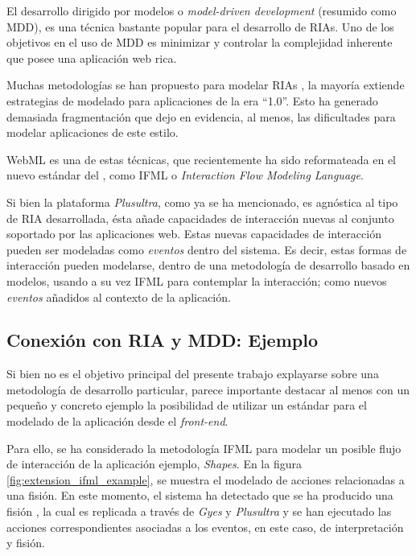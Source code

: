 El desarrollo dirigido por modelos o \emph{model-driven development} (resumido como MDD), es una técnica bastante popular para el desarrollo de RIAs. Uno de los objetivos en el uso de MDD es minimizar y controlar la complejidad inherente que posee una aplicación web rica. 

Muchas metodologías se han propuesto para modelar RIAs \citep{wright2008requirements} \citep{preciado2005necessity}, la mayoría extiende estrategias de modelado para aplicaciones de la era ``1.0''. Esto ha generado demasiada fragmentación que dejo en evidencia, al menos, las dificultades para modelar aplicaciones de este estilo. 

WebML\citep{omg:webml} es una de estas técnicas, que recientemente ha sido reformateada en el nuevo estándar del \citet{omg:omg}, como IFML \citep{omg:ifml} o \emph{Interaction Flow Modeling Language}. 

Si bien la plataforma \emph{Plusultra}, como ya se ha mencionado, es agnóstica al tipo de RIA desarrollada, ésta añade capacidades de interacción nuevas al conjunto soportado por las aplicaciones web. Estas nuevas capacidades de interacción pueden ser modeladas como \emph{eventos} dentro del sistema. 
Es decir, estas formas de interacción pueden modelarse, dentro de una metodología de desarrollo basado en modelos, usando a su vez IFML para contemplar la interacción; como nuevos \emph{eventos} añadidos al contexto de la aplicación.

\subsection{Conexión con RIA y MDD: Ejemplo}

Si bien no es el objetivo principal del presente trabajo explayarse sobre una metodología de desarrollo particular, parece importante destacar al menos con un pequeño y concreto ejemplo la posibilidad de utilizar un estándar para el modelado de la aplicación desde el \emph{front-end}. 

Para ello, se ha considerado la metodología IFML para modelar un posible flujo de interacción de la aplicación ejemplo, \emph{Shapes}. En la figura \ref{fig:extension_ifml_example}, se muestra el modelado de acciones relacionadas a una fisión. En este momento, el sistema ha detectado que se ha producido una fisión , la cual es replicada a través de \emph{Gyes} y \emph{Plusultra} y se han ejecutado las acciones correspondientes asociadas a los eventos, en este caso, de interpretación y fisión.


